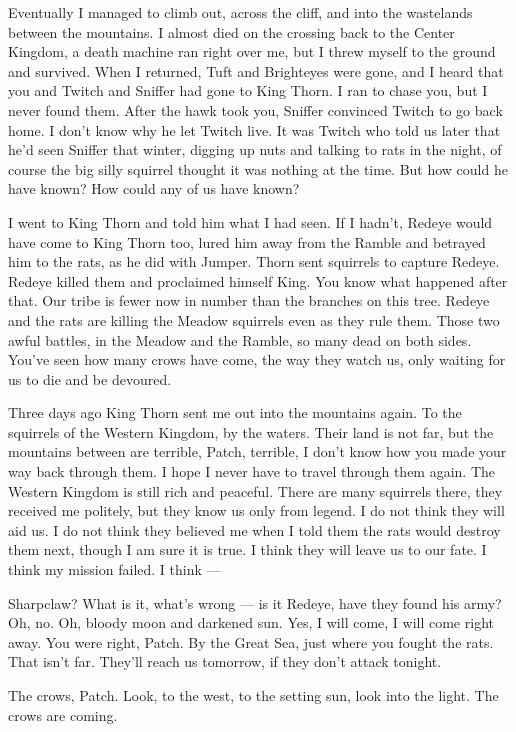 \documentclass[ebook,oneside,openany,12pt]{memoir}
\begin{document}
Eventually I managed to climb out, across the cliff, and into the
wastelands between the mountains. I almost died on the crossing back
to the Center Kingdom, a death machine ran right over me, but I threw
myself to the ground and survived. When I returned, Tuft and
Brighteyes were gone, and I heard that you and Twitch and Sniffer had
gone to King Thorn. I ran to chase you, but I never found them. After
the hawk took you, Sniffer convinced Twitch to go back home. I don’t
know why he let Twitch live. It was Twitch who told us later that he’d
seen Sniffer that winter, digging up nuts and talking to rats in the
night, of course the big silly squirrel thought it was nothing at the
time. But how could he have known? How could any of us have known?

I went to King Thorn and told him what I had seen. If I hadn’t, Redeye
would have come to King Thorn too, lured him away from the Ramble and
betrayed him to the rats, as he did with Jumper. Thorn sent squirrels
to capture Redeye. Redeye killed them and proclaimed himself King. You
know what happened after that. Our tribe is fewer now in number than
the branches on this tree. Redeye and the rats are killing the Meadow
squirrels even as they rule them. Those two awful battles, in the
Meadow and the Ramble, so many dead on both sides. You’ve seen how
many crows have come, the way they watch us, only waiting for us to
die and be devoured.

Three days ago King Thorn sent me out into the mountains again. To the
squirrels of the Western Kingdom, by the waters. Their land is not
far, but the mountains between are terrible, Patch, terrible, I don’t
know how you made your way back through them. I hope I never have to
travel through them again. The Western Kingdom is still rich and
peaceful. There are many squirrels there, they received me politely,
but they know us only from legend. I do not think they will aid us. I
do not think they believed me when I told them the rats would destroy
them next, though I am sure it is true. I think they will leave us to
our fate. I think my mission failed. I think —

Sharpclaw? What is it, what’s wrong — is it Redeye, have they found
his army? Oh, no. Oh, bloody moon and darkened sun. Yes, I will come,
I will come right away. You were right, Patch. By the Great Sea, just
where you fought the rats. That isn’t far. They’ll reach us tomorrow,
if they don’t attack tonight.

The crows, Patch. Look, to the west, to the setting sun, look into the
light. The crows are coming.
\end{document}
